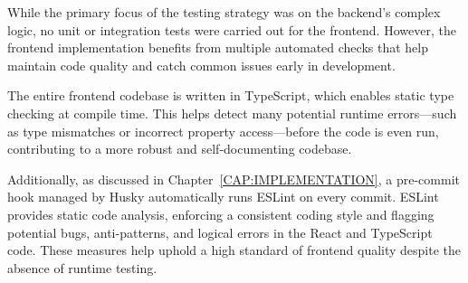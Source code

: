 While the primary focus of the testing strategy was on the backend's complex logic, no unit or integration tests were carried out for the frontend. However, the frontend implementation benefits from multiple automated checks that help maintain code quality and catch common issues early in development.

The entire frontend codebase is written in TypeScript, which enables static type checking at compile time. This helps detect many potential runtime errors—such as type mismatches or incorrect property access—before the code is even run, contributing to a more robust and self-documenting codebase.

Additionally, as discussed in Chapter~\ref{CAP:IMPLEMENTATION}, a pre-commit hook managed by Husky automatically runs ESLint on every commit. ESLint provides static code analysis, enforcing a consistent coding style and flagging potential bugs, anti-patterns, and logical errors in the React and TypeScript code. These measures help uphold a high standard of frontend quality despite the absence of runtime testing.